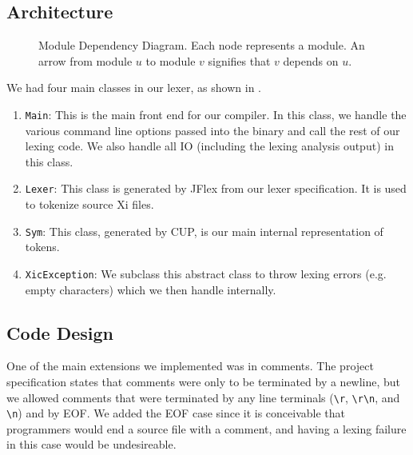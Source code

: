 \documentclass{hw}
\begin{document}
\subsection{Architecture}
\begin{figure}[h]
  \centering
  \caption{%
    Module Dependency Diagram. Each node represents a module. An arrow from
    module $u$ to module $v$ signifies that $v$ depends on $u$.
  }
  \label{fig:mdd}
\end{figure}

We had four main classes in our lexer, as shown in .
\begin{enumerate}
  \item{\texttt{Main}:}
    This is the main front end for our compiler. In this class, we handle the
    various command line options passed into the binary and call the rest of
    our lexing code. We also handle all IO (including the lexing analysis
    output) in this class.

  \item{\texttt{Lexer}:}
    This class is generated by JFlex from our lexer specification.  It is used
    to tokenize source Xi files.

  \item{\texttt{Sym}:}
    This class, generated by CUP, is our main internal representation of
    tokens.

  \item{\texttt{XicException}:}
    We subclass this abstract class to throw lexing errors (e.g.  empty
    characters) which we then handle internally.
\end{enumerate}

\subsection{Code Design}
One of the main extensions we implemented was in comments. The project
specification states that comments were only to be terminated by a newline, but
we allowed comments that were terminated by any line terminals (\verb$\r$,
\verb$\r\n$, and \verb$\n$) and by EOF.  We added the EOF case since it is
conceivable that programmers would end a source file with a comment, and having
a lexing failure in this case would be undesireable.
\end{document}
